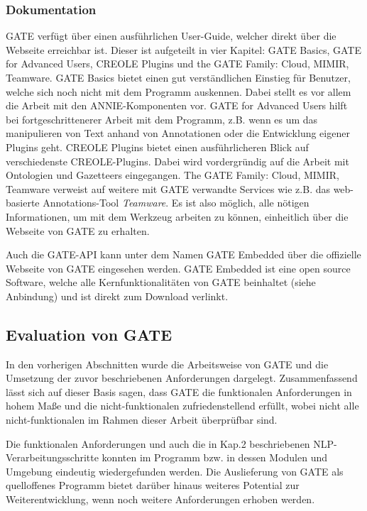 \documentclass[12pt]{report}
\begin{document}
\subsubsection{Dokumentation}

GATE verfügt über einen ausführlichen User-Guide, welcher direkt über die Webseite erreichbar ist. Dieser ist aufgeteilt in vier Kapitel: GATE Basics, GATE for Advanced Users, CREOLE Plugins und the GATE Family: Cloud, MIMIR, Teamware.
GATE Basics bietet einen gut verständlichen Einstieg für Benutzer, welche sich noch nicht mit dem Programm auskennen. Dabei stellt es vor allem die Arbeit mit den ANNIE-Komponenten vor.
GATE for Advanced Users hilft bei fortgeschrittenerer Arbeit mit dem Programm, z.B. wenn es um das manipulieren von Text anhand von Annotationen oder die Entwicklung eigener Plugins geht.
CREOLE Plugins bietet einen ausführlicheren Blick auf verschiedenste CREOLE-Plugins. Dabei wird vordergründig auf die Arbeit mit Ontologien und Gazetteers eingegangen.
The GATE Family: Cloud, MIMIR, Teamware verweist auf weitere mit GATE verwandte Services wie z.B. das web-basierte Annotations-Tool \textit{Teamware}.
Es ist also möglich, alle nötigen Informationen, um mit dem Werkzeug arbeiten zu können, einheitlich über die Webseite von GATE zu erhalten.

Auch die GATE-API kann unter dem Namen GATE Embedded über die offizielle Webseite von GATE eingesehen werden. GATE Embedded ist eine open source Software, welche alle Kernfunktionalitäten von GATE beinhaltet (siehe Anbindung) und ist direkt zum Download verlinkt.
 
\subsection{Evaluation von GATE}
In den vorherigen Abschnitten wurde die Arbeitsweise von GATE und die Umsetzung der zuvor beschriebenen Anforderungen dargelegt. Zusammenfassend lässt sich auf dieser Basis sagen, dass GATE die funktionalen Anforderungen in hohem Maße und die nicht-funktionalen zufriedenstellend erfüllt, wobei nicht alle nicht-funktionalen im Rahmen dieser Arbeit überprüfbar sind. 

Die funktionalen Anforderungen und auch die in Kap.2 beschriebenen NLP-Verarbeitungsschritte konnten im Programm bzw. in dessen Modulen und Umgebung eindeutig wiedergefunden werden. Die Auslieferung von GATE als quelloffenes Programm bietet darüber hinaus weiteres Potential zur Weiterentwicklung, wenn noch weitere Anforderungen erhoben werden.
\end{document}
